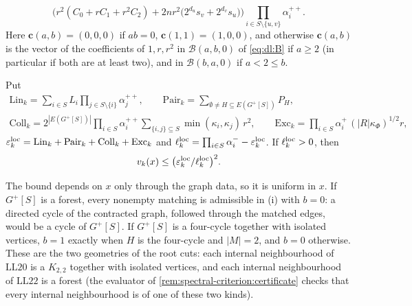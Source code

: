 \begin{lemma}
\begin{enumerate}[label=\textup{(\alph*)}]
\begin{enumerate}[label=\textup{(\roman*)}]
    \[
      \Big(r^2(C_0+rC_1+r^2C_2)+2nr^2\big(2^{d_u}s_v+2^{d_v}s_u\big)\Big)
      \prod_{i\in S\setminus\{u,v\}}\alpha^{++}_i .
    \]
    Here $\mathbf c(a,b)=(0,0,0)$ if $ab=0$, $\mathbf c(1,1)=(1,0,0)$, and otherwise
    $\mathbf c(a,b)$ is the vector of the coefficients of $1,r,r^2$ in
    $\mathcal B(a,b,0)$ of \eqref{eq:dl:B} if $a\ge2$ (in
    particular if both are at least two), and in
    $\mathcal B(b,a,0)$ if $a<2\le b$.
  \end{enumerate}
  Put
  \begin{gather*}
    \mathrm{Lin}_k=\sum_{i\in S}L_i\prod_{j\in S\setminus\{i\}}\alpha^{++}_j,\qquad
    \mathrm{Pair}_k=\sum_{\emptyset\ne H\subseteq E(G^+[S])}P_H,\\
    \mathrm{Coll}_k=2^{|E(G^+[S])|}\prod_{i\in S}\alpha^{++}_i
    \sum_{\{i,j\}\subseteq S}\min(\kappa_i,\kappa_j)\,r^2,\qquad
    \mathrm{Exc}_k=\prod_{i\in S}\alpha^+_i\,(|R|\kappa_\Phi)^{1/2}r,
  \end{gather*}
  $\varepsilon^{\rm loc}_k=\mathrm{Lin}_k+\mathrm{Pair}_k+\mathrm{Coll}_k+\mathrm{Exc}_k$ and
  $\ell^{\rm loc}_k=\prod_{i\in S}\alpha^-_i-\varepsilon^{\rm loc}_k$. If $\ell^{\rm loc}_k>0$, then
  \begin{equation}\label{eq:push:localvariance}
    v_k(x)\le\big(\varepsilon^{\rm loc}_k/\ell^{\rm loc}_k\big)^2 .
  \end{equation}
\end{enumerate}
\end{lemma}

The bound depends on $x$ only through the graph data, so it is uniform in $x$. If
$G^+[S]$ is a forest, every nonempty matching is admissible in (i) with $b=0$: a
directed cycle of the contracted graph, followed through the matched edges, would
be a cycle of $G^+[S]$. If $G^+[S]$ is a four-cycle together with isolated
vertices, $b=1$ exactly when $H$ is the four-cycle and $|M|=2$, and $b=0$
otherwise. These are the two geometries of the root cuts: each internal
neighbourhood of $\mathrm{LL20}$ is a $K_{2,2}$ together with isolated vertices,
and each internal neighbourhood of $\mathrm{LL22}$ is a forest (the evaluator of \cref{rem:spectral-criterion:certificate} checks that every internal neighbourhood is of one of these two kinds).

